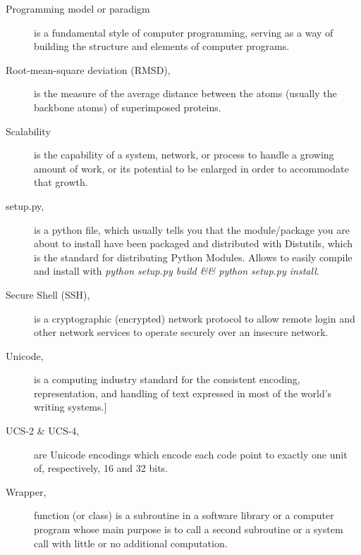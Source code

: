 \begin{description}
\item [Programming model or paradigm] is a fundamental style of computer programming, serving as a way of building the structure and elements of computer programs.
\item [Root-mean-square deviation (RMSD),] is the measure of the average distance between the atoms (usually the backbone atoms) of superimposed proteins.
\item [Scalability] is the capability of a system, network, or process to handle a growing amount of work, or its potential to be enlarged in order to accommodate that growth.
\item [setup.py,] is a python file, which usually tells you that the module/package you are about to install have been packaged and distributed with Distutils, which is the standard for distributing Python Modules. Allows to easily compile and install with \textit{python setup.py build \&\& python setup.py install}.
\item [Secure Shell (SSH),]  is a cryptographic (encrypted) network protocol to allow remote login and other network services to operate securely over an insecure network. 
\item [Unicode,] is a computing industry standard for the consistent encoding, representation, and handling of text expressed in most of the world's writing systems.]
\item [UCS-2 \& UCS-4, ] are Unicode encodings which encode each code point to exactly one unit of, respectively, 16 and 32 bits. 
\item [Wrapper,]  function (or class) is a subroutine in a software library or a computer program whose main purpose is to call a second subroutine or a system call with little or no additional computation. 

\end{description}